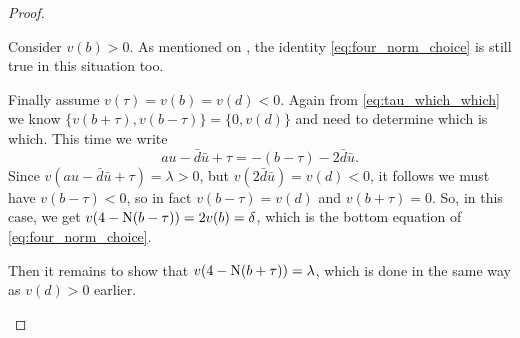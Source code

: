 \begin{proof}
\begin{itemize}
  \ii Consider $v(b) > 0$.
  As mentioned on \cite[p.\ 242]{ref:AFL}, the identity \eqref{eq:four_norm_choice}
  is still true in this situation too.

  \ii Finally assume $v(\tau) = v(b) = v(d) < 0$.
  Again from \eqref{eq:tau_which_which}
  we know $\{v(b+\tau), v(b-\tau)\} = \{0, v(d)\}$ and need to determine which is which.
  This time we write
  \[ au - \bar d \bar u + \tau = -(b - \tau) - 2 \bar d \bar u. \]
  Since $v(au - \bar d \bar u + \tau) = \lambda > 0$,
  but $v(2 \bar d \bar u) = v(d) < 0$,
  it follows we must have $v(b-\tau) < 0$,
  so in fact $v(b-\tau) = v(d)$ and $v(b+\tau) = 0$.
  So, in this case, we get $v(4 - \operatorname{N}(b-\tau)) = 2v(b) = \delta$,
  which is the bottom equation of \eqref{eq:four_norm_choice}.

  Then it remains to show that $v(4-\operatorname{N}(b+\tau)) = \lambda$,
  which is done in the same way as $v(d) > 0$ earlier.
  \qedhere
  \end{itemize}
\end{proof}
